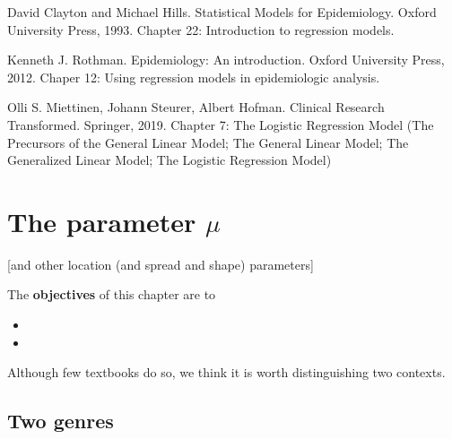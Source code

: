 \documentclass[]{book}
\begin{document}
David Clayton and Michael Hills. Statistical Models for Epidemiology. Oxford University Press, 1993. Chapter 22: Introduction to regression models.

Kenneth J. Rothman. Epidemiology: An introduction.
Oxford University Press, 2012. Chaper 12: Using regression models in epidemiologic analysis.

Olli S. Miettinen, Johann Steurer, Albert Hofman.
Clinical Research Transformed. Springer, 2019.
Chapter 7: The Logistic Regression Model (The Precursors of the General Linear Model; The General Linear Model; The Generalized Linear Model; The Logistic Regression Model)

\hypertarget{paraMu}{%
\chapter{\texorpdfstring{The parameter \(\mu\)}{The parameter \textbackslash{}mu}}\label{paraMu}}

{[}and other location (and spread and shape) parameters{]}

The \textbf{objectives} of this chapter are to

\begin{itemize}
\item
\item
\end{itemize}

Although few textbooks do so, we think it is worth distinguishing two contexts.

\hypertarget{two-genres}{%
\section{Two genres}\label{two-genres}}
\end{document}
